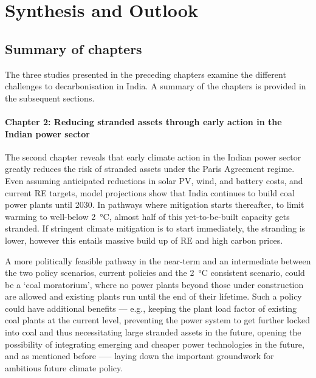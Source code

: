 \documentclass[../thesis.tex]{subfiles}
\begin{document}
\chapter{Synthesis and Outlook}\label{ch:summary}
\section{Summary of chapters}
The three studies presented in the preceding chapters examine the different challenges to decarbonisation in India. A summary of the chapters is provided in the subsequent sections.


\subsubsection{Chapter 2: Reducing stranded assets through early action in the Indian power sector}
The second chapter reveals that early climate action in the Indian power sector greatly reduces the risk of stranded assets under the Paris Agreement regime. Even assuming anticipated reductions in solar PV, wind, and battery costs, and current RE targets, model projections show that India continues to build coal power plants until 2030. In pathways where mitigation starts thereafter, to limit warming to well-below \SI{2}{\degreeCelsius}, almost half of this yet-to-be-built capacity gets stranded. If stringent climate mitigation is to start immediately, the stranding is lower, however this entails massive build up of RE and high carbon prices. 

A more politically feasible pathway in the near-term and an intermediate between the two policy scenarios, current policies and the \SI{2}{\degreeCelsius} consistent scenario, could be a `coal moratorium', where no power plants beyond those under construction are allowed and existing plants run until the end of their lifetime. Such a policy could have additional benefits --- e.g., keeping the plant load factor of existing coal plants at the current level, preventing the power system to get further locked into coal and thus necessitating large stranded assets in the future, opening the possibility of integrating emerging and cheaper power technologies in the future, and as mentioned before --— laying down the important groundwork for ambitious future climate policy. 
\end{document}
